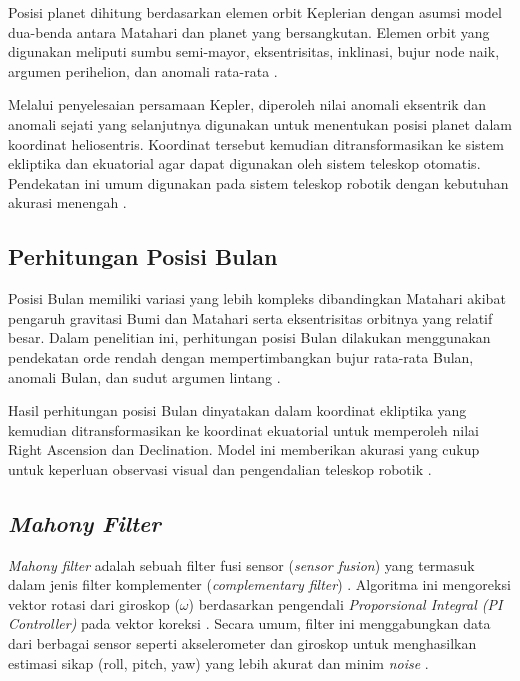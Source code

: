 Posisi planet dihitung berdasarkan elemen orbit Keplerian dengan asumsi model dua-benda antara Matahari dan planet yang bersangkutan. Elemen orbit yang digunakan meliputi sumbu semi-mayor, eksentrisitas, inklinasi, bujur node naik, argumen perihelion, dan anomali rata-rata \cite{Meeus1998,EMStandish1992}. 

Melalui penyelesaian persamaan Kepler, diperoleh nilai anomali eksentrik dan anomali sejati yang selanjutnya digunakan untuk menentukan posisi planet dalam koordinat heliosentris. Koordinat tersebut kemudian ditransformasikan ke sistem ekliptika dan ekuatorial agar dapat digunakan oleh sistem teleskop otomatis. Pendekatan ini umum digunakan pada sistem teleskop robotik dengan kebutuhan akurasi menengah \cite{Meeus1998}.

\subsection{Perhitungan Posisi Bulan} \label{II.TeoriBulan}

Posisi Bulan memiliki variasi yang lebih kompleks dibandingkan Matahari akibat pengaruh gravitasi Bumi dan Matahari serta eksentrisitas orbitnya yang relatif besar. Dalam penelitian ini, perhitungan posisi Bulan dilakukan menggunakan pendekatan orde rendah dengan mempertimbangkan bujur rata-rata Bulan, anomali Bulan, dan sudut argumen lintang \cite{Meeus1998}. 

Hasil perhitungan posisi Bulan dinyatakan dalam koordinat ekliptika yang kemudian ditransformasikan ke koordinat ekuatorial untuk memperoleh nilai Right Ascension dan Declination. Model ini memberikan akurasi yang cukup untuk keperluan observasi visual dan pengendalian teleskop robotik \cite{Meeus1998}.


\subsection{\textit{Mahony Filter}} \label{II.Teori5}
\textit{Mahony filter} adalah sebuah filter fusi sensor (\textit{sensor fusion}) yang termasuk dalam jenis filter komplementer (\textit{complementary filter}) \cite{Maton2024}. Algoritma ini mengoreksi vektor rotasi dari giroskop ($\omega$) berdasarkan pengendali \textit{Proporsional Integral (PI Controller)} pada vektor koreksi \cite{MinhLongHoang2022}. Secara umum, filter ini menggabungkan data dari berbagai sensor seperti akselerometer dan giroskop untuk menghasilkan estimasi sikap (roll, pitch, yaw) yang lebih akurat dan minim \textit{noise} \cite{MinhLongHoang2022}.

